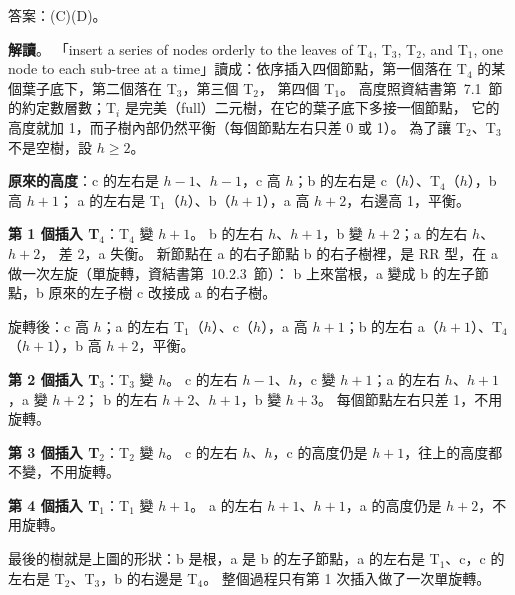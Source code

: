 \begin{pastsoln}
答案：(C)(D)。

\textbf{解讀}。 「insert a series of nodes orderly to the leaves of T$_4$, T$_3$, T$_2$, and T$_1$, one node to each
sub-tree at a time」讀成：依序插入四個節點，第一個落在 T$_4$ 的某個葉子底下，第二個落在 T$_3$，第三個 T$_2$，
第四個 T$_1$。 高度照資結書第~7.1~節的約定數層數；T$_i$ 是完美（full）二元樹，在它的葉子底下多接一個節點，
它的高度就加 1，而子樹內部仍然平衡（每個節點左右只差 0 或 1）。 為了讓 T$_2$、T$_3$ 不是空樹，設 $h \ge 2$。

\textbf{原來的高度}：c 的左右是 $h-1$、$h-1$，c 高 $h$；b 的左右是 c（$h$）、T$_4$（$h$），b 高 $h+1$；
a 的左右是 T$_1$（$h$）、b（$h+1$），a 高 $h+2$，右邊高 1，平衡。

\textbf{第 1 個插入 T$_4$}：T$_4$ 變 $h+1$。 b 的左右 $h$、$h+1$，b 變 $h+2$；a 的左右 $h$、$h+2$，
差 2，a 失衡。 新節點在 a 的右子節點 b 的右子樹裡，是 RR 型，在 a 做一次左旋（單旋轉，資結書第~10.2.3~節）：
b 上來當根，a 變成 b 的左子節點，b 原來的左子樹 c 改接成 a 的右子樹。
\begin{center}
\end{center}
旋轉後：c 高 $h$；a 的左右 T$_1$（$h$）、c（$h$），a 高 $h+1$；b 的左右 a（$h+1$）、T$_4$（$h+1$），b 高 $h+2$，平衡。

\textbf{第 2 個插入 T$_3$}：T$_3$ 變 $h$。 c 的左右 $h-1$、$h$，c 變 $h+1$；a 的左右 $h$、$h+1$，a 變 $h+2$；
b 的左右 $h+2$、$h+1$，b 變 $h+3$。 每個節點左右只差 1，不用旋轉。

\textbf{第 3 個插入 T$_2$}：T$_2$ 變 $h$。 c 的左右 $h$、$h$，c 的高度仍是 $h+1$，往上的高度都不變，不用旋轉。

\textbf{第 4 個插入 T$_1$}：T$_1$ 變 $h+1$。 a 的左右 $h+1$、$h+1$，a 的高度仍是 $h+2$，不用旋轉。

最後的樹就是上圖的形狀：b 是根，a 是 b 的左子節點，a 的左右是 T$_1$、c，c 的左右是 T$_2$、T$_3$，b 的右邊是 T$_4$。
整個過程只有第 1 次插入做了一次單旋轉。


\end{pastsoln}
